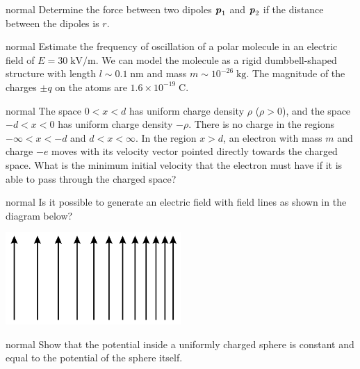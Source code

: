 \hypertarget{P87}{}
\begin{solution}{normal} %
Determine the force between two dipoles $\textbf{\textit{p}}_1$ and $\textbf{\textit{p}}_2$ if the distance between the dipoles is $r$.
\end{solution}

\hypertarget{P88}{}
\begin{solution}{normal} %
Estimate the frequency of oscillation of a polar molecule in an electric field of $E=30\;\text{kV}/\text{m}$. We can model the molecule as a rigid dumbbell-shaped structure with length $l\sim 0.1\;\text{nm}$ and mass $m\sim 10^{-26}\;\text{kg}$. The magnitude of the charges $\pm q$ on the atoms are $1.6\times10^{-19}\;\text{C}$.
\end{solution}

\hypertarget{P89}{}
\begin{solution}{normal} %
The space $0<x<d$ has uniform charge density $\rho$ ($\rho>0$), and the space $-d<x<0$ has uniform charge density $-\rho$. There is no charge in the regions $-\infty<x<-d$ and $d<x<\infty$. In the region $x>d$, an electron with mass $m$ and charge $-e$ moves with its velocity vector pointed directly towards the charged space. What is the minimum initial velocity that the electron must have if it is able to pass through the charged space?
\end{solution}

\hypertarget{P90}{}
\begin{solution}{normal} %
Is it possible to generate an electric field with field lines as shown in the diagram below?
\begin{center}
    \includegraphics[width=0.5\textwidth]{S3 Figures/S3-90.png}
\end{center}
\end{solution}

\hypertarget{P91}{}
\begin{solution}{normal} %
Show that the potential inside a uniformly charged sphere is constant and equal to the potential of the sphere itself.
\end{solution}

